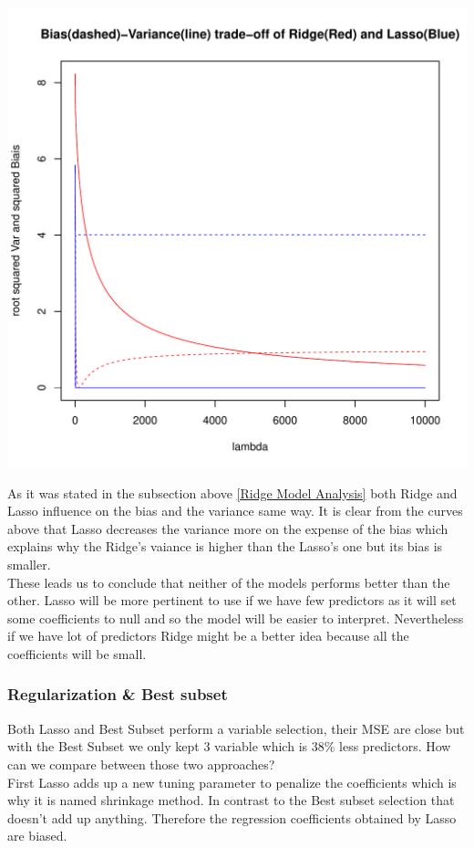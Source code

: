 \documentclass[]{report}
\begin{document}
\begin{center}
	\includegraphics[width=0.8\linewidth]{Figures/var_biais_ridge_lasso.pdf}
\end{center}
As it was stated in the subsection above \ref{Ridge Model Analysis} both Ridge and Lasso influence on the bias and the variance same way.
It is clear from the curves above that Lasso decreases the variance more on the expense of the bias which explains why the Ridge's vaiance is higher than the Lasso's one but its bias is smaller. \\
These leads us to conclude that neither of the models performs better than the other. Lasso will be more pertinent to use if we have few predictors as it will set some coefficients to null and so the model will be easier to interpret. Nevertheless if we have lot of predictors Ridge might be a better idea because all the coefficients will be small. 

\subsubsection{Regularization \& Best subset}
Both Lasso and Best Subset perform a variable selection, their MSE are close but with the Best Subset we only kept 3 variable which is 38\% less predictors. How can we compare between those two approaches?\\
First Lasso adds up a new tuning parameter to penalize the coefficients which is why it is named shrinkage method. In contrast to the Best subset selection that doesn't add up anything. Therefore the regression coefficients obtained by Lasso are biased.
\end{document}
